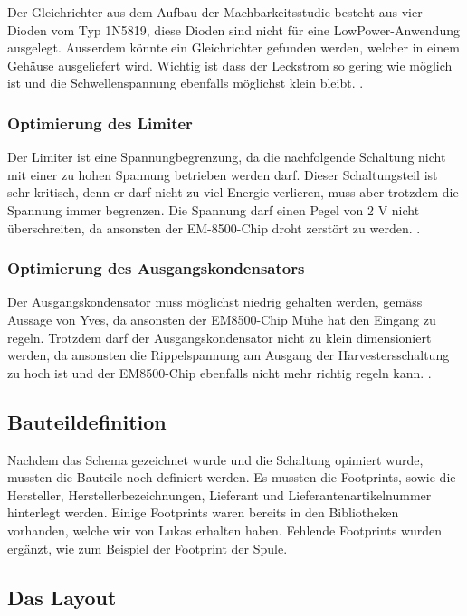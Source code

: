 Der Gleichrichter aus dem Aufbau der Machbarkeitsstudie besteht aus vier Dioden vom Typ 1N5819, diese Dioden sind nicht für eine LowPower-Anwendung ausgelegt. Ausserdem könnte ein Gleichrichter gefunden werden, welcher in einem Gehäuse ausgeliefert wird. Wichtig ist dass der Leckstrom so gering wie möglich ist und die Schwellenspannung ebenfalls möglichst klein bleibt. 
.

\subsubsection{Optimierung des Limiter}

Der Limiter ist eine Spannungbegrenzung, da die nachfolgende Schaltung nicht mit einer zu hohen Spannung betrieben werden darf. Dieser Schaltungsteil ist sehr kritisch, denn er darf nicht zu viel Energie verlieren, muss aber trotzdem die Spannung immer begrenzen. Die Spannung darf einen Pegel von 2 V nicht überschreiten, da ansonsten der EM-8500-Chip droht zerstört zu werden. 
.

\subsubsection{Optimierung des Ausgangskondensators}

Der Ausgangskondensator muss möglichst niedrig gehalten werden, gemäss Aussage von Yves, da ansonsten der EM8500-Chip Mühe hat den Eingang zu regeln. Trotzdem darf der Ausgangskondensator nicht zu klein dimensioniert werden, da ansonsten die Rippelspannung am Ausgang der Harvestersschaltung zu hoch ist und der EM8500-Chip ebenfalls nicht mehr richtig regeln kann.
.


\subsection{Bauteildefinition}

Nachdem das Schema gezeichnet wurde und die Schaltung opimiert wurde, mussten die Bauteile noch definiert werden. Es mussten die Footprints, sowie die Hersteller, Herstellerbezeichnungen, Lieferant und Lieferantenartikelnummer hinterlegt werden. Einige Footprints waren bereits in den Bibliotheken vorhanden, welche wir von Lukas erhalten haben. Fehlende Footprints wurden ergänzt, wie zum Beispiel der Footprint der Spule.


\subsection{Das Layout}

